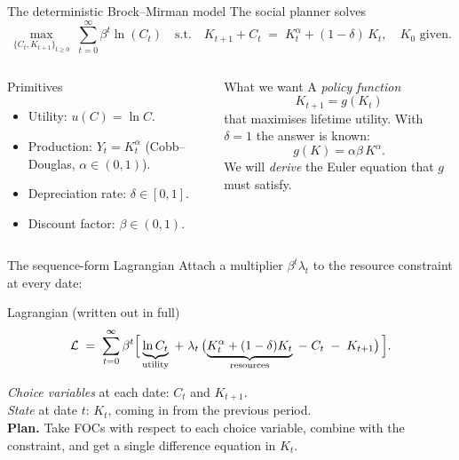 \documentclass[aspectratio=169,11pt]{beamer}
\begin{document}
\begin{frame}{The deterministic Brock--Mirman model}
\small The social planner solves
\[
\max_{\{C_t, K_{t+1}\}_{t \ge 0}} \;\sum_{t=0}^{\infty} \beta^t \ln(C_t)
\quad\text{s.t.}\quad
K_{t+1} + C_t \;=\; K_t^{\alpha} + (1-\delta)\,K_t, \quad K_0\text{ given}.
\]
\vspace{-6pt}
\begin{columns}[t]
\begin{block}{Primitives}
\small
\begin{itemize}\itemsep2pt
\item Utility: $u(C) = \ln C$.
\item Production: $Y_t = K_t^\alpha$ (Cobb--Douglas, $\alpha \in (0,1)$).
\item Depreciation rate: $\delta \in [0,1]$.
\item Discount factor: $\beta \in (0,1)$.
\end{itemize}
\end{block}
\begin{block}{What we want}
\small
A \emph{policy function}
\[
K_{t+1} = g(K_t)
\]
that maximises lifetime utility. With $\delta = 1$ the answer is known:
\[
g(K) = \alpha\beta\, K^\alpha.
\]
We will \emph{derive} the Euler equation that $g$ must satisfy.
\end{block}
\end{columns}
\end{frame}

\begin{frame}{The sequence-form Lagrangian}
\small Attach a multiplier $\beta^t \lambda_t$ to the resource constraint at every date:
\begin{block}{Lagrangian (written out in full)}
\small
\[
\mathcal{L} \;=\; \sum_{t=0}^{\infty} \beta^t \Bigl[\, \underbrace{\ln C_t}_{\text{utility}} \;+\; \lambda_t\,\bigl(\underbrace{K_t^\alpha + (1-\delta)K_t}_{\text{resources}} \;-\; C_t \;-\; K_{t+1}\bigr)\,\Bigr].
\]
\end{block}
\vspace{2pt}
\emph{Choice variables} at each date: $C_t$ and $K_{t+1}$.\\
\emph{State} at date $t$: $K_t$, coming in from the previous period.\\[6pt]
\textbf{Plan.} Take FOCs with respect to each choice variable, combine with the constraint, and get a single difference equation in $K_t$.
\end{frame}
\end{document}
